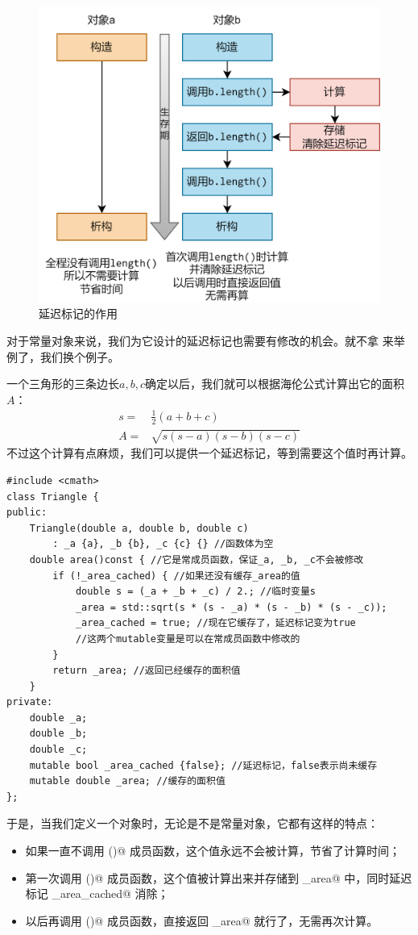 \begin{figure}[htbp]
    \centering
    \includegraphics[width=.8\textwidth]{../images/generalized_parts/08_lazy_tag_300.png}
    \caption{延迟标记的作用}
\end{figure}
对于常量对象来说，我们为它设计的延迟标记也需要有修改的机会。就不拿 \lstinline@valarri@ 来举例了，我们换个例子。\par
一个三角形的三条边长$a, b, c$确定以后，我们就可以根据海伦公式计算出它的面积$A$：
\begin{align*}
s=&{}\frac12(a+b+c)\\
A=&{}\sqrt{s(s-a)(s-b)(s-c)}
\end{align*}
不过这个计算有点麻烦，我们可以提供一个延迟标记，等到需要这个值时再计算。
\begin{lstlisting}
#include <cmath>
class Triangle {
public:
    Triangle(double a, double b, double c)
        : _a {a}, _b {b}, _c {c} {} //函数体为空
    double area()const { //它是常成员函数，保证_a, _b, _c不会被修改
        if (!_area_cached) { //如果还没有缓存_area的值
            double s = (_a + _b + _c) / 2.; //临时变量s
            _area = std::sqrt(s * (s - _a) * (s - _b) * (s - _c));
            _area_cached = true; //现在它缓存了，延迟标记变为true
            //这两个mutable变量是可以在常成员函数中修改的
        }
        return _area; //返回已经缓存的面积值
    }
private:
    double _a;
    double _b;
    double _c;
    mutable bool _area_cached {false}; //延迟标记，false表示尚未缓存
    mutable double _area; //缓存的面积值
};
\end{lstlisting}\par
于是，当我们定义一个对象时，无论是不是常量对象，它都有这样的特点：
\begin{itemize}
    \item 如果一直不调用 \lstinline@area()@ 成员函数，这个值永远不会被计算，节省了计算时间；
    \item 第一次调用 \lstinline@area()@ 成员函数，这个值被计算出来并存储到 \lstinline@_area@ 中，同时延迟标记 \lstinline@_area_cached@ 消除；
    \item 以后再调用 \lstinline@area()@ 成员函数，直接返回 \lstinline@_area@ 就行了，无需再次计算。
\end{itemize}\par

